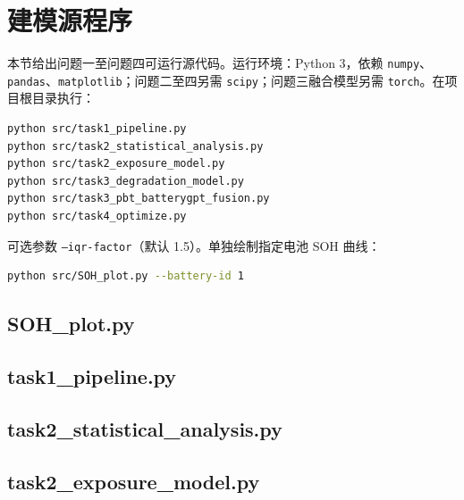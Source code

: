 \section{建模源程序}
\label{app:code}

本节给出问题一至问题四可运行源代码。运行环境：Python 3，依赖 \texttt{numpy}、\texttt{pandas}、\texttt{matplotlib}；问题二至四另需 \texttt{scipy}；问题三融合模型另需 \texttt{torch}。在项目根目录执行：
\begin{lstlisting}[language=bash]
python src/task1_pipeline.py
python src/task2_statistical_analysis.py
python src/task2_exposure_model.py
python src/task3_degradation_model.py
python src/task3_pbt_batterygpt_fusion.py
python src/task4_optimize.py
\end{lstlisting}
可选参数 \texttt{--iqr-factor}（默认 1.5）。单独绘制指定电池 SOH 曲线：
\begin{lstlisting}[language=bash]
python src/SOH_plot.py --battery-id 1
\end{lstlisting}

\subsection{SOH\_plot.py}



\subsection{task1\_pipeline.py}



\subsection{task2\_statistical\_analysis.py}



\subsection{task2\_exposure\_model.py}



